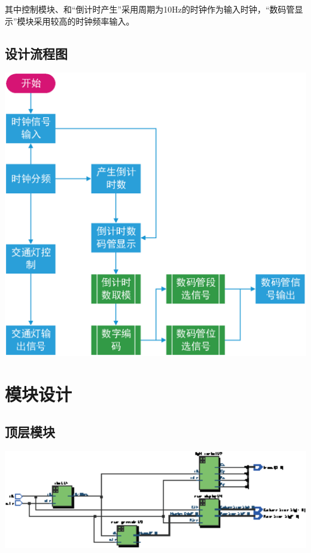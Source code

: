 \documentclass[12pt,a4paper]{article}
\begin{document}
		其中控制模块、和“倒计时产生”采用周期为10Hz的时钟作为输入时钟，“数码管显示”模块采用较高的时钟频率输入。
		
		\subsection{设计流程图}
		\begin{center}
			\includegraphics[width=14cm]{pic/lct.eps}
		\end{center}
	\section{模块设计}
	\subsection{顶层模块}
	\begin{center}
		\includegraphics[width=16cm]{pic/pdf/top.eps}
	\end{center}
\end{document}
